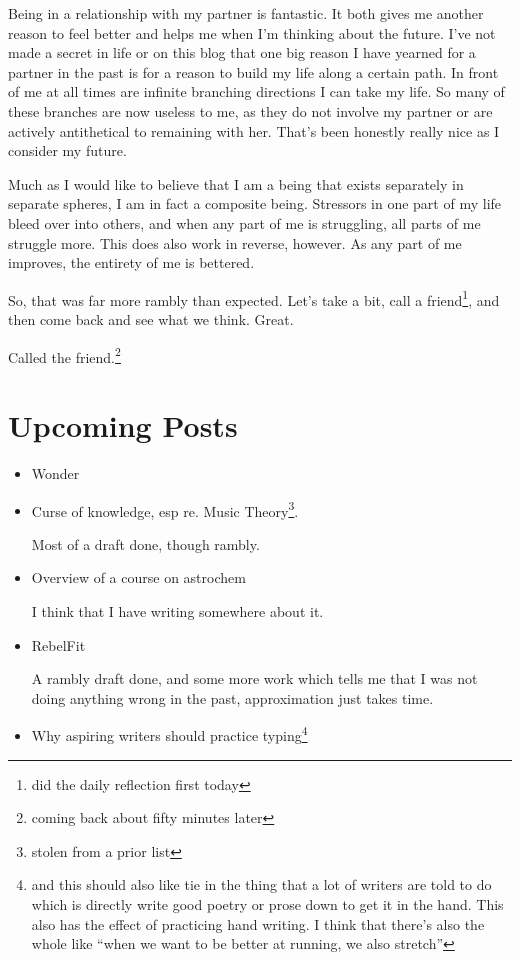 \documentclass[12pt]{article}
\newcommand{\say}[1]{``#1''}
\renewcommand{\,}{\textsuperscript{,}}
\begin{document}
Being in a relationship with my partner is fantastic. It both gives me another reason to feel better and helps me when I'm thinking about the future. I've not made a secret in life or on this blog that one big reason I have yearned for a partner in the past is for a reason to build my life along a certain path.  
In front of me at all times are infinite branching directions I can take my life.  
So many of these branches are now useless to me, as they do not involve my partner or are actively antithetical to remaining with her.  
That's been honestly really nice as I consider my future.

Much as I would like to believe that I am a being that exists separately in separate spheres, I am in fact a composite being.  
Stressors in one part of my life bleed over into others, and when any part of me is struggling, all parts of me struggle more.  
This does also work in reverse, however.  
As any part of me improves, the entirety of me is bettered.

So, that was far more rambly than expected.  
Let's take a bit, call a friend\footnote{did the daily reflection first today}, and then come back and see what we think.  
Great.

Called the friend.\footnote{coming back about fifty minutes later}

\section{Upcoming Posts}  
\begin{itemize}

\item Wonder  
\item Curse of knowledge, esp re. Music Theory\footnote{stolen from a prior list}.

Most of a draft done, though rambly.  
\item Overview of a course on astrochem

I think that I have writing somewhere about it.  
\item RebelFit

A rambly draft done, and some more work which tells me that I was not doing anything wrong in the past, approximation just takes time.  
\item Why aspiring writers should practice typing\footnote{and this should also like tie in the thing that a lot of writers are told to do which is directly write good poetry or prose down to get it in the hand. This also has the effect of practicing hand writing. I think that there's also the whole like \say{when we want to be better at running, we also stretch}}

\end{itemize}
\end{document}
